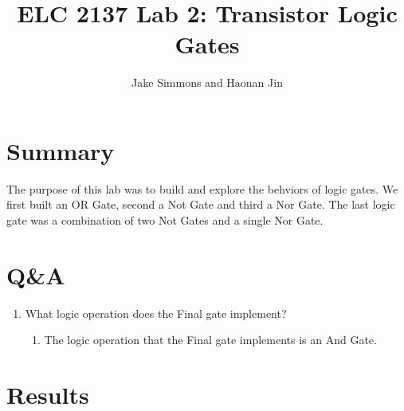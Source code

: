 \documentclass[11pt]{article}
\begin{document}
\title{ELC 2137 Lab 2: Transistor Logic Gates}
\author{Jake Simmons and Haonan Jin}
\maketitle

\section*{Summary}

The purpose of this lab was to build and explore the behviors of logic gates. We first built an OR Gate, second a Not Gate and third a Nor Gate. The last logic gate was a combination of two Not Gates and a single Nor Gate.      


\section*{Q\&A}

\begin{enumerate}
	\item What logic operation does the Final gate implement?
		\begin{enumerate}
			\item The logic operation that the Final gate implements is an And Gate.
		\end{enumerate}
\end{enumerate}



\section*{Results}
	
\end{document}
